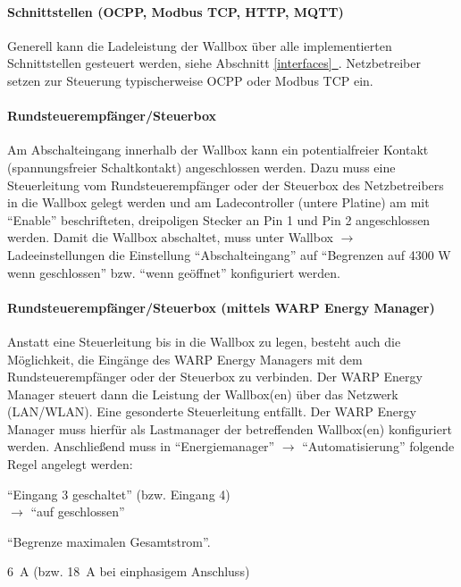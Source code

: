 \documentclass[a4paper,10pt]{article}
\newcommand*{\fullref}[1]{Abschnitt \hyperref[{#1}]{\ref*{#1}~\nameref*{#1}}}
\begin{document}
\begin{multicols*}{2}
    \vspace{-0.3cm}
    \paragraph*{Schnittstellen (OCPP, Modbus TCP, HTTP, MQTT)}
    Generell kann die Ladeleistung der Wallbox über alle implementierten Schnittstellen gesteuert werden, siehe \fullref{interfaces}.
    Netzbetreiber setzen zur Steuerung typischerweise OCPP oder Modbus TCP ein.

    \vspace{-0.3cm}
    \paragraph*{Rundsteuerempfänger/Steuerbox}
    Am Abschalteingang innerhalb der Wallbox kann ein potentialfreier Kontakt (spannungsfreier Schaltkontakt)
    angeschlossen werden. Dazu muss eine Steuerleitung vom Rundsteuerempfänger
    oder der Steuerbox des Netzbetreibers in die Wallbox gelegt werden und am Ladecontroller (untere Platine)
    am mit \enquote{Enable} beschrifteten, dreipoligen Stecker an Pin 1 und Pin 2 angeschlossen werden.
    Damit die Wallbox abschaltet, muss unter Wallbox $\rightarrow$ Ladeeinstellungen die Einstellung \enquote{Abschalteingang} auf \enquote{Begrenzen auf 4300 W wenn geschlossen} bzw. \enquote{wenn geöffnet} konfiguriert werden.

    \vspace{-0.3cm}
    \paragraph*{Rundsteuerempfänger/Steuerbox (mittels WARP Energy Manager)}
    Anstatt eine Steuerleitung bis in die Wallbox zu legen, besteht auch die
    Möglichkeit, die Eingänge des WARP Energy Managers mit dem Rundsteuerempfänger oder der
    Steuerbox zu verbinden. Der WARP Energy Manager steuert dann die
    Leistung der Wallbox(en) über das Netzwerk (LAN/WLAN). Eine gesonderte
    Steuerleitung entfällt.
    Der WARP Energy Manager muss hierfür als Lastmanager der betreffenden Wallbox(en) konfiguriert werden.
    Anschließend muss in \enquote{Energiemanager} $\rightarrow$ \enquote{Automatisierung}
    folgende Regel angelegt werden:

    \begin{description}[labelindent=0.5cm]
        \item[Bedingung] \enquote{Eingang 3 geschaltet} (bzw. Eingang 4)\\\hspace{-0.5cm} $\rightarrow$ \enquote{auf geschlossen}
        \item[Aktion] \enquote{Begrenze maximalen Gesamtstrom}.
        \item[Maximaler Gesamtstrom] \SI{6}{\ampere} (bzw. \SI{18}{\ampere} bei einphasigem Anschluss)
    \end{description}


\end{multicols*}
\end{document}
